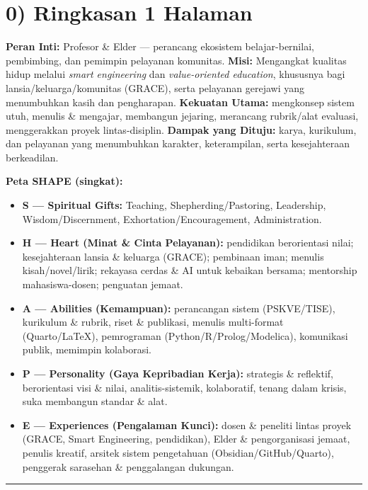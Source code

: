 \documentclass[
  letterpaper,
  DIV=11,
  numbers=noendperiod]{scrreprt}
\providecommand{\tightlist}{%
  \setlength{\itemsep}{0pt}\setlength{\parskip}{0pt}}
\begin{document}
\section{0) Ringkasan 1 Halaman}\label{ringkasan-1-halaman}

\textbf{Peran Inti:} Profesor \& Elder --- perancang ekosistem
belajar-bernilai, pembimbing, dan pemimpin pelayanan komunitas.
\textbf{Misi:} Mengangkat kualitas hidup melalui \emph{smart
engineering} dan \emph{value-oriented education}, khususnya bagi
lansia/keluarga/komunitas (GRACE), serta pelayanan gerejawi yang
menumbuhkan kasih dan pengharapan. \textbf{Kekuatan Utama:} mengkonsep
sistem utuh, menulis \& mengajar, membangun jejaring, merancang
rubrik/alat evaluasi, menggerakkan proyek lintas-disiplin.
\textbf{Dampak yang Dituju:} karya, kurikulum, dan pelayanan yang
menumbuhkan karakter, keterampilan, serta kesejahteraan berkeadilan.

\textbf{Peta SHAPE (singkat):}

\begin{itemize}
\tightlist
\item
  \textbf{S --- Spiritual Gifts:} Teaching, Shepherding/Pastoring,
  Leadership, Wisdom/Discernment, Exhortation/Encouragement,
  Administration.
\item
  \textbf{H --- Heart (Minat \& Cinta Pelayanan):} pendidikan
  berorientasi nilai; kesejahteraan lansia \& keluarga (GRACE);
  pembinaan iman; menulis kisah/novel/lirik; rekayasa cerdas \& AI untuk
  kebaikan bersama; mentorship mahasiswa-dosen; penguatan jemaat.
\item
  \textbf{A --- Abilities (Kemampuan):} perancangan sistem (PSKVE/TISE),
  kurikulum \& rubrik, riset \& publikasi, menulis multi-format
  (Quarto/LaTeX), pemrograman (Python/R/Prolog/Modelica), komunikasi
  publik, memimpin kolaborasi.
\item
  \textbf{P --- Personality (Gaya Kepribadian Kerja):} strategis \&
  reflektif, berorientasi visi \& nilai, analitis-sistemik, kolaboratif,
  tenang dalam krisis, suka membangun standar \& alat.
\item
  \textbf{E --- Experiences (Pengalaman Kunci):} dosen \& peneliti
  lintas proyek (GRACE, Smart Engineering, pendidikan), Elder \&
  pengorganisasi jemaat, penulis kreatif, arsitek sistem pengetahuan
  (Obsidian/GitHub/Quarto), penggerak sarasehan \& penggalangan
  dukungan.
\end{itemize}

\begin{center}\rule{0.5\linewidth}{0.5pt}\end{center}
\end{document}

